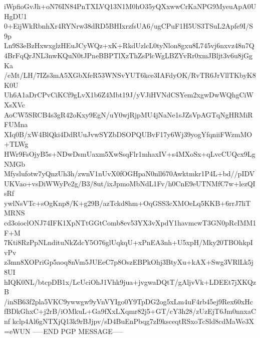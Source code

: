 iWpfioGvJh+oN76IN84PnTXLVQ13N1M0hO35yQXxwwCrKaNPG9MyeuApA0UHgDU1
0+EijWkRbnhXr4RYNrw38dRD5BHIxrzfsUA6/ugCPuF1H5US3TSuL2Apfe9I/S9p
Ln9S3eBzHxwxglzHEuJCyWQz+xK+RkdUzlcL0tyNlon8gxu8L745vj6nxvz48n7Q
4BrFqQrJNL3nwKQuN0tJPneBBPTlXzThZsPlcWgLBZYvRr0xmJBljt3v6u8jGgKa
/eMt/LH/7IZs3mA5XGbXfeR53WNSvYUT6kce3IAFdyOK/RvTR6JrVllTKbyK8K0U
Uh6A1aDrCPvCiKCf9gLvX1b6Z4Mbt19J/yVJiHVNdCSYem2xgwDwWQhgCiWXsXVc
AoCW5SRCB4s3gR42oKxy9EgN/uY0wjRjpMU4jNaNe1sJZsVpAGTqNgHRMiRFUMna
XIq0B/xW4BlQki4DdRUuJvwSYZbDSOPQUBvF17y6Wj39yogYfqniiFWzmMO+TLWg
HWr9FsOjyB5s+NDwDsmUaxm5XwSsqFlr1mhaxIV+s4MXoSx+qLvcCUQcx9LgNMGb
Mfyslufotw7yQnzUh3h/zwnV1nUvX0fOGHpaN0nll670Awktmkr1P4L+bd//pIDV
UKVao+vsDiWWyPe2g/B3/8ut/ixJpmoMbNdL1Fv/h0CnE9eUTNMfC7w+lezQIsRf
ywlNsVTc+sOgKnp8/K+g29B/azTckd8hm+OqGSS3cXMOeLq5KKB+6rrJ7liTMRNS
cd3oioclONJ74IFK1XpNTtGGtComb8ev53YX3vXpdY1havmcwT3GN0pRcIMM1F+M
7Kti8RzPpNLndituNkZdcY5O76glUqkqU+xPnEA3nh+U5xpH/Mky20TBOhkpIvPv
z3mn8XOPriGp5aoq8nVm5JUEeC7p8OszEBPkOhj3BtyXu+kAX+Swg3VRlLk5j8UI
hIQK0NL/btcpDB1x/LcUciOhJ1Vhk9jua+jvgwaDQtT/gAljvVk+LDEEt7jXKQzB
/inSB63f2pla5VKC9ywwgw9yVnVYIgo0Y9TpDG2og5xLm4uF4rb45ej9Rex60xHc
fBDkGhxC+j2rB/iOMkuL+Ga9fXxLXqmr82j5+GT/cY3h28/zUzEjT6Jm0nnxaCnf
kclp4Al6gNTXjQ13k9rBJjpv/sD4BuEnPbqg7zI9ksceqtRSxoTcSld8cdMaWe3X
=eWUN
-----END PGP MESSAGE-----
